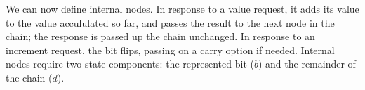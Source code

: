 \documentclass[orivec,envcountsame]{llncs}
\newcommand{\mkwd}[1]{\mathsf{#1}}
\newcommand{\link}[2]{#1 \leftrightarrow #2}
\newcommand{\rec}[1]{\mkwd{rec}\:#1}
\newcommand{\clabel}[1]{\mathrm{#1}}
\newcommand{\sel}[2]{#1[\clabel{#2}]}
\newcommand{\lrkwd}{\mkwd{fix}}
\begin{document}
%
%
We can now define internal nodes. In response to a value request, it adds its value to the value
accululated so far, and passes the result to the next node in the chain; the response is passed up
the chain unchanged. In response to an increment request, the bit flips, passing on a carry option
if needed. Internal nodes require two state components: the represented bit ($b$)
and the remainder of the chain ($d$).
%
%
\newcommand{\gvifthen}[3]{\mkwd{if}\:#1\:\mkwd{then}\:#2\:\mkwd{else}\:#3}
%
\end{document}
